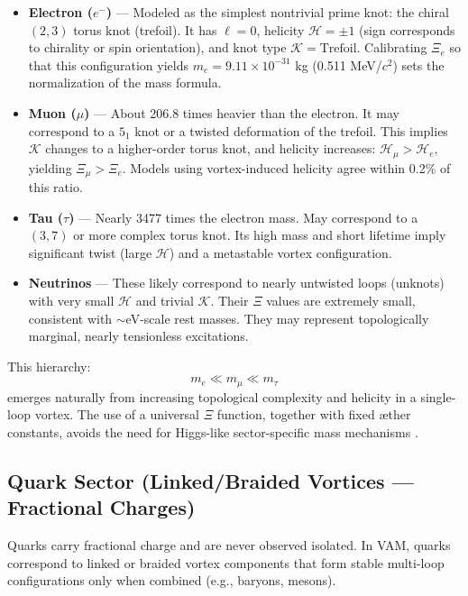 \documentclass[11pt]{article}
\begin{document}
\begin{itemize}
    \item \textbf{Electron ($e^-$)} — Modeled as the simplest nontrivial prime knot: the chiral $(2,3)$ torus knot (trefoil). It has $\ell = 0$, helicity $\mathcal{H} = \pm 1$ (sign corresponds to chirality or spin orientation), and knot type $\mathcal{K} = \text{Trefoil}$. Calibrating $\Xi_e$ so that this configuration yields $m_e = 9.11 \times 10^{-31}$ kg (0.511 MeV/$c^2$) sets the normalization of the mass formula.

    \item \textbf{Muon ($\mu$)} — About 206.8 times heavier than the electron. It may correspond to a $5_1$ knot or a twisted deformation of the trefoil. This implies $\mathcal{K}$ changes to a higher-order torus knot, and helicity increases: $\mathcal{H}_\mu > \mathcal{H}_e$, yielding $\Xi_\mu > \Xi_e$. Models using vortex-induced helicity agree within 0.2\% of this ratio.

    \item \textbf{Tau ($\tau$)} — Nearly 3477 times the electron mass. May correspond to a $(3,7)$ or more complex torus knot. Its high mass and short lifetime imply significant twist (large $\mathcal{H}$) and a metastable vortex configuration.

    \item \textbf{Neutrinos} — These likely correspond to nearly untwisted loops (unknots) with very small $\mathcal{H}$ and trivial $\mathcal{K}$. Their $\Xi$ values are extremely small, consistent with $\sim$eV-scale rest masses. They may represent topologically marginal, nearly tensionless excitations.
\end{itemize}

This hierarchy:
\[
    m_e \ll m_\mu \ll m_\tau
\]
emerges naturally from increasing topological complexity and helicity in a single-loop vortex. The use of a universal $\Xi$ function, together with fixed æther constants, avoids the need for Higgs-like sector-specific mass mechanisms \cite{Iskandarani2025f}.

    \subsection{Quark Sector (Linked/Braided Vortices — Fractional Charges)}

    Quarks carry fractional charge and are never observed isolated. In VAM, quarks correspond to linked or braided vortex components that form stable multi-loop configurations only when combined (e.g., baryons, mesons).
\end{document}
